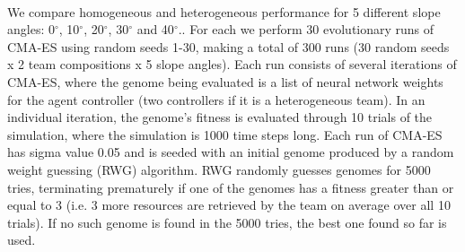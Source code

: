 \documentclass[sigconf]{aamas}  %
\begin{document}
\paragraph{}
We compare homogeneous and heterogeneous performance for 5 different slope angles: 0$^{\circ}$, 10$^{\circ}$, 20$^{\circ}$, 30$^{\circ}$ and 40$^{\circ}$.. For each we perform 30 evolutionary runs of CMA-ES using random seeds 1-30, making a total of 300 runs (30 random seeds x 2 team compositions x 5 slope angles). Each run consists of several iterations of CMA-ES, where the genome being evaluated is a list of neural network weights for the agent controller (two controllers if it is a heterogeneous team). In an individual iteration, the genome's fitness is evaluated through 10 trials of the simulation, where the simulation is 1000 time steps long. Each run of CMA-ES has sigma value 0.05 and is seeded with an initial genome produced by a random weight guessing (RWG) algorithm. RWG randomly guesses genomes for 5000 tries, terminating prematurely if one of the genomes has a fitness greater than or equal to 3 (i.e. 3 more resources are retrieved by the team on average over all 10 trials). If no such genome is found in the 5000 tries, the best one found so far is used.



\balance  %
\end{document}
